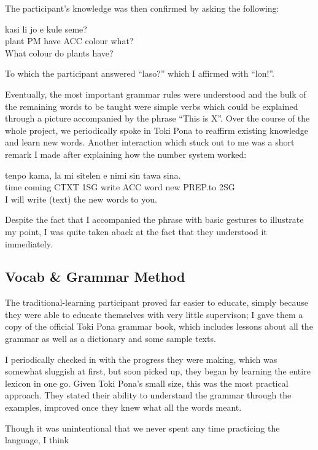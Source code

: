 \documentclass[a4paper,10pt]{article}
\begin{document}
The participant's knowledge was then confirmed by asking the following:

\begin{exe}
 \ex
 \gll kasi li jo e kule seme? \\
 plant PM have ACC colour what?\\
 \glt What colour do plants have?
\end{exe}

To which the participant answered ``laso?'' which I affirmed with ``lon!''.

Eventually, the most important grammar rules were understood and the bulk of the remaining words to
be taught were simple verbs which could be explained through a picture accompanied by the phrase
``This is X''. Over the course of the whole project, we periodically spoke in Toki Pona to reaffirm
existing knowledge and learn new words. Another interaction which stuck out to me was a short
remark I made after explaining how the number system worked:

\begin{exe}
 \ex
 \gll tenpo kama, la mi sitelen e nimi sin tawa sina. \\
 time coming CTXT 1SG write ACC word new PREP.to 2SG \\
 \glt I will write (text) the new words to you.
\end{exe}

Despite the fact that I accompanied the phrase with basic gestures to illustrate my point,
I was quite taken aback at the fact that they understood it immediately.


\subsection{Vocab \& Grammar Method}
The traditional-learning participant proved far easier to educate, simply because they were able to
educate themselves with very little supervison; I gave them a copy of the official Toki Pona grammar
book, which includes lessons about all the grammar as well as a dictionary and some sample texts.

I periodically checked in with the progress they were making, which was somewhat sluggish at first, but
soon picked up, they began by learning the entire lexicon in one go. Given Toki Pona's small size, this
was the most practical approach. They stated their ability to understand the grammar through the examples,
improved once they knew what all the words meant.

Though it was unintentional that we never spent any time practicing the language, I think 
\end{document}
